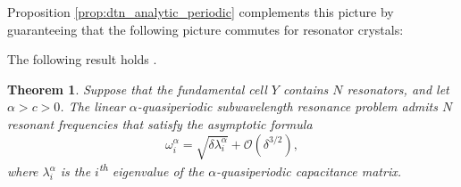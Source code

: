 \documentclass[a4paper,reqno,twoside]{amsart}
\numberwithin{equation}{section}
\newtheorem{theorem}{Theorem}[section]
\theoremstyle{definition}
\newcommand{\<}{\ensuremath \leq}
\renewcommand{\>}{\ensuremath \geq}
\newcommand{\on}[1]{\operatorname{#1}}
\begin{document}
Proposition \ref{prop:dtn_analytic_periodic} complements this picture by guaranteeing that the following picture commutes for resonator crystals:

\begin{figure}[!h]
\centering
{}
\label{fig:commutative-diagram}
\end{figure}

The following result holds \cite{ammari.davies.ea2024Functional}.
\begin{theorem}
    Suppose that the fundamental cell $Y$ contains $N$ resonators, and let $\alpha>c>0$. The linear $\alpha$-quasiperiodic subwavelength resonance problem admits $N$ resonant frequencies that satisfy the asymptotic formula 
    \begin{equation}
        \omega_i^\alpha = \sqrt{\delta\lambda_i^\alpha} + \mathcal{O}(\delta^{3/2}),
    \end{equation}
    where $\lambda_i^\alpha$ is the  $i$\textsuperscript{th} eigenvalue of the $\alpha$-quasiperiodic capacitance matrix.
\end{theorem}
\end{document}
